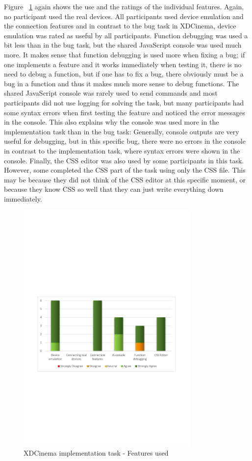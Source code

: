 Figure ~\ref{fig:xdc_impl_features_used} again shows the use and the ratings of the individual features. Again, no participant used the real devices. All participants used device emulation and the connection features and in contrast to the bug task in XDCinema, device emulation was rated as useful by all participants. Function debugging was used a bit less than in the bug task, but the shared JavaScript console was used much more. It makes sense that function debugging is used more when fixing a bug; if one implements a feature and it works immediately when testing it, there is no need to debug a function, but if one has to fix a bug, there obviously must be a bug in a function and thus it makes much more sense to debug functions. The shared JavaScript console was rarely used to send commands and most participants did not use logging for solving the task, but many participants had some syntax errors when first testing the feature and noticed the error messages in the console. This also explains why the console was used more in the implementation task than in the bug task: Generally, console outputs are very useful for debugging, but in this specific bug, there were no errors in the console in contrast to the implementation task, where syntax errors were shown in the console. Finally, the CSS editor was also used by some participants in this task. However, some completed the CSS part of the task using only the CSS file. This may be because they did not think of the CSS editor at this specific moment, or because they know CSS so well that they can just write everything down immediately. 

\begin{figure}[H]
  \centering
    \includegraphics[width=0.8\textwidth]{images/charts/xdc_impl_features_used.pdf}
	\caption{XDCinema implementation task - Features used}
	\label{fig:xdc_impl_features_used}
\end{figure}

